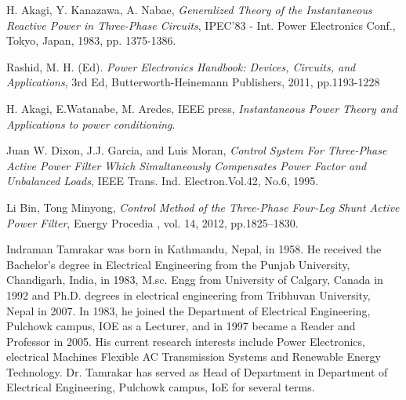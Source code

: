 \documentclass[journal,twoside]{IEEEtran}
\begin{document}
\begin{thebibliography}{9}

 H. Akagi, Y. Kanazawa, A. Nabae, \emph{Generalized Theory of the
Instantaneous Reactive Power in Three-Phase Circuits},
IPEC'83 - Int. Power Electronics Conf., Tokyo, Japan, 1983,
pp. 1375-1386.

 Rashid, M. H. (Ed). \emph{Power Electronics Handbook: Devices,
Circuits, and Applications}, 3rd Ed, Butterworth-Heinemann
Publishers, 2011, pp.1193-1228

 H. Akagi, E.Watanabe, M. Aredes, IEEE press, \emph{Instantaneous
Power Theory and Applications to power conditioning}.

 Juan
W. Dixon, J.J. Garcia, and Luis Moran, \emph{Control
System For Three-Phase Active Power Filter Which
Simultaneously Compensates Power Factor
and
Unbalanced
Loads}, IEEE Trans. Ind. Electron.Vol.42,
No.6, 1995.

 Li Bin, Tong Minyong, \emph{Control Method of the Three-Phase
Four-Leg Shunt Active Power Filter}, Energy Procedia , vol.
14, 2012, pp.1825–1830.

\end{thebibliography}
\begin{IEEEbiography}{Indraman Tamrakar}
was born in
Kathmandu, Nepal, in 1958. He received the Bachelor's degree in
Electrical Engineering from the Punjab University, Chandigarh, India, in 1983, M.sc. Engg from University of
Calgary, Canada in 1992 and Ph.D. degrees in electrical
engineering from Tribhuvan University, Nepal in 2007. In
1983, he joined the Department of Electrical
Engineering, Pulchowk campus, IOE as a
Lecturer, and in 1997 became a Reader and
Professor in 2005. His current research interests
include Power Electronics, electrical Machines
Flexible AC Transmission Systems and Renewable
Energy Technology. Dr. Tamrakar has served as
Head of Department in Department of Electrical
Engineering, Pulchowk campus, IoE for several
terms.
\end{IEEEbiography}
\vspace{-2cm}
\end{document}
